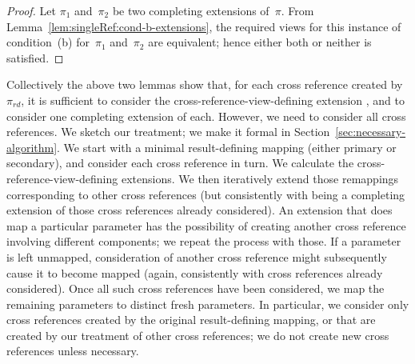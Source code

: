 
\begin{proof}
%
Let $\pi_1$ and~$\pi_2$ be two completing extensions of~$\pi$.  From
Lemma~\ref{lem:singleRef:cond-b-extensions}, the required views for this
instance of condition~(b) for~$\pi_1$ and~$\pi_2$ are equivalent; hence either
both or neither is satisfied.
\end{proof}


Collectively the above two lemmas show that, for each cross reference created
by~$\pi_{rd}$, it is sufficient to consider the cross-reference-view-defining
extension , and to consider one completing extension of each.  However, we
need to consider all cross references.  We sketch our treatment; we make it
formal in Section~\ref{sec:necessary-algorithm}.  We start with a minimal
result-defining mapping (either primary or secondary), and consider each cross
reference in turn.  We calculate the cross-reference-view-defining extensions.
We then iteratively extend those remappings corresponding to other cross
references (but consistently with being a completing extension of those cross
references already considered).  An extension that does map a particular
parameter has the possibility of creating another cross reference involving
different components; we repeat the process with those.  If a parameter is
left unmapped, consideration of another cross reference might subsequently
cause it to become mapped (again, consistently with cross references already
considered).  Once all such cross references have been considered, we map the
remaining parameters to distinct fresh parameters.  In particular, we consider
only cross references created by the original result-defining mapping, or that
are created by our treatment of other cross references; we do not create new
cross references unless necessary.

